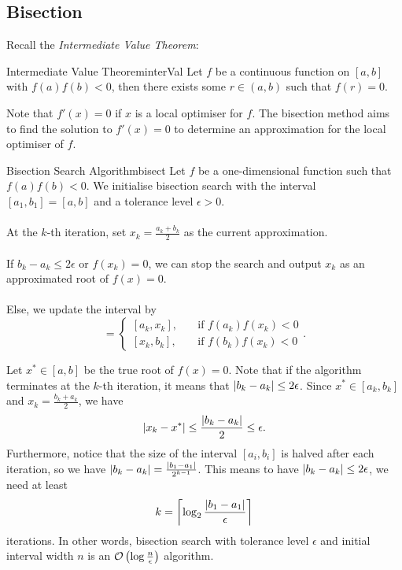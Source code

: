 \documentclass[math, code]{amznotes}
\theoremstyle{remark}
\begin{document}
\subsection{Bisection}
Recall the \textit{Intermediate Value Theorem}:
\begin{thmbox}{Intermediate Value Theorem}{interVal}
    Let $f$ be a continuous function on $[a, b]$ with $f(a)f(b) < 0$, then there exists some $r \in (a, b)$ such that $f(r) = 0$.
\end{thmbox}
Note that $f'(x) = 0$ if $x$ is a local optimiser for $f$. The bisection method aims to find the solution to $f'(x) = 0$ to determine an approximation for the local optimiser of $f$.
\begin{tecbox}{Bisection Search Algorithm}{bisect}
    Let $f$ be a one-dimensional function such that $f(a)f(b) < 0$. We initialise bisection search with the interval $[a_1, b_1] = [a, b]$ and a tolerance level $\epsilon > 0$.
    \\\\
    At the $k$-th iteration, set $x_k = \frac{a_k + b_k}{2}$ as the current approximation. 
    \\\\
    If $b_k - a_k \leq 2\epsilon$ or $f(x_k) = 0$, we can stop the search and output $x_k$ as an approximated root of $f(x) = 0$.
    \\\\
    Else, we update the interval by
    \begin{equation*}
        [a_{k + 1}, b_{k + 1}] = \begin{cases}
            [a_k, x_k], & \quad\textrm{if } f(a_k)f(x_k) < 0 \\
            [x_k, b_k], & \quad\textrm{if } f(b_k)f(x_k) < 0
        \end{cases}.
    \end{equation*} 
\end{tecbox}
Let $x^* \in [a, b]$ be the true root of $f(x) = 0$. Note that if the algorithm terminates at the $k$-th iteration, it means that ${\left\lvert {b_k - a_k} \right\rvert} \leq 2\epsilon$. Since $x^* \in [a_k, b_k]$ and $x_k = \frac{b_k + a_k}{2}$, we have
\begin{equation*}
    {\left\lvert {x_k - x^*} \right\rvert} \leq \frac{{\left\lvert {b_k - a_k} \right\rvert}}{2} \leq \epsilon.
\end{equation*}
Furthermore, notice that the size of the interval $[a_i, b_i]$ is halved after each iteration, so we have ${\left\lvert {b_k - a_k} \right\rvert} = \frac{{\left\lvert {b_1 - a_1} \right\rvert}}{2^{k - 1}}$. This means to have ${\left\lvert {b_k - a_k} \right\rvert} \leq 2\epsilon$, we need at least
\begin{equation*}
    k = \left\lceil\log_2\frac{{\left\lvert {b_1 - a_1} \right\rvert}}{\epsilon}\right\rceil
\end{equation*}
iterations. In other words, bisection search with tolerance level $\epsilon$ and initial interval width $n$ is an $\mathcal{O}\left(\log\frac{n}{\epsilon}\right)$ algorithm.
\end{document}
